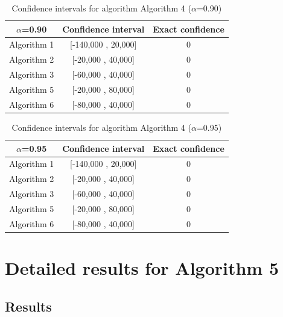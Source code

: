 \documentclass[a4paper,10pt]{article}
\begin{document}
\begin{table}[!htp]
\centering\small
\begin{tabular}{
|c|c|c|}
\hline
 $\alpha$=0.90 & Confidence interval & Exact confidence \\ \hline 
Algorithm 1 & [-140,000 , 20,000] & 0\\ \hline 
Algorithm 2 & [-20,000 , 40,000] & 0\\ \hline 
Algorithm 3 & [-60,000 , 40,000] & 0\\ \hline 
Algorithm 5 & [-20,000 , 80,000] & 0\\ \hline 
Algorithm 6 & [-80,000 , 40,000] & 0\\ \hline 

\end{tabular}
\caption{Confidence intervals for algorithm Algorithm 4 ($\alpha$=0.90)}
\end{table}
\begin{table}[!htp]
\centering\small
\begin{tabular}{
|c|c|c|}
\hline
 $\alpha$=0.95 & Confidence interval & Exact confidence \\ \hline 
Algorithm 1 & [-140,000 , 20,000] & 0\\ \hline 
Algorithm 2 & [-20,000 , 40,000] & 0\\ \hline 
Algorithm 3 & [-60,000 , 40,000] & 0\\ \hline 
Algorithm 5 & [-20,000 , 80,000] & 0\\ \hline 
Algorithm 6 & [-80,000 , 40,000] & 0\\ \hline 

\end{tabular}
\caption{Confidence intervals for algorithm Algorithm 4 ($\alpha$=0.95)}
\end{table}

 \clearpage 


\section{Detailed results for Algorithm 5}


\subsection{Results}
\end{document}
